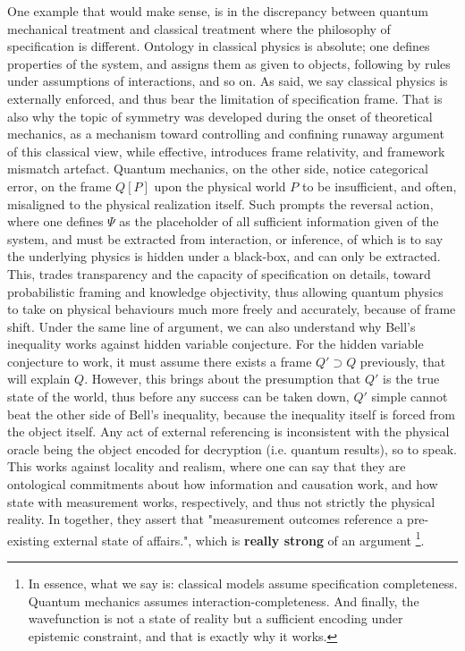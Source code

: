 One example that would make sense, is in the discrepancy between quantum mechanical treatment and classical treatment where the philosophy of specification is different. Ontology in classical physics is absolute; one defines properties of the system, and assigns them as given to objects, following by rules under assumptions of interactions, and so on. As said, we say classical physics is externally enforced, and thus bear the limitation of specification frame. That is also why the topic of symmetry was developed during the onset of theoretical mechanics, as a mechanism toward controlling and confining runaway argument of this classical view, while effective, introduces frame relativity, and framework mismatch artefact. Quantum mechanics, on the other side, notice categorical error, on the frame $Q[P]$ upon the physical world $P$ to be insufficient, and often, misaligned to the physical realization itself. Such prompts the reversal action, where one defines $\Psi$ as the placeholder of all sufficient information given of the system, and must be extracted from interaction, or inference, of which is to say the underlying physics is hidden under a black-box, and can only be extracted. This, trades transparency and the capacity of specification on details, toward probabilistic framing and knowledge objectivity, thus allowing quantum physics to take on physical behaviours much more freely and accurately, because of frame shift. Under the same line of argument, we can also understand why Bell's inequality works against hidden variable conjecture. For the hidden variable conjecture to work, it must assume there exists a frame $Q'\supset Q$ previously, that will explain $Q$. However, this brings about the presumption that $Q'$ is the true state of the world, thus before any success can be taken down, $Q'$ simple cannot beat the other side of Bell's inequality, because the inequality itself is forced from the object itself. Any act of external referencing is inconsistent with the physical oracle being the object encoded for decryption (i.e. quantum results), so to speak. This works against locality and realism, where one can say that they are ontological commitments about how information and causation work, and how state with measurement works, respectively, and thus not strictly the physical reality. In together, they assert that "measurement outcomes reference a pre-existing external state of affairs.", which is \textbf{really strong} of an argument \footnote{In essence, what we say is: classical models assume specification completeness. Quantum mechanics assumes interaction-completeness. And finally, the wavefunction is not a state of reality but a sufficient encoding under epistemic constraint, and that is exactly why it works.}. 

